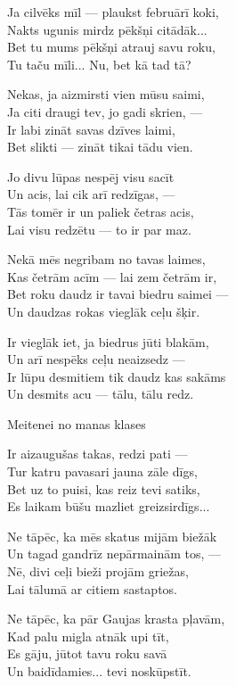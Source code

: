 \documentclass[14pt]{extarticle}
\begin{document}
{{Ja cilvēks mīl --- plaukst februārī koki,\\
Nakts ugunis mirdz pēkšņi citādāk...\\
Bet tu mums pēkšņi atrauj savu roku,\\
Tu taču mīli... Nu, bet kā tad tā?

Nekas, ja aizmirsti vien mūsu saimi,\\
Ja citi draugi tev, jo gadi skrien, ---\\
Ir labi zināt savas dzīves laimi,\\
Bet slikti --- zināt tikai tādu vien. 

Jo divu lūpas nespēj visu sacīt\\
Un acis, lai cik arī redzīgas, --- \\
Tās tomēr ir un paliek četras acis,\\
Lai visu redzētu --- to ir par maz. 

Nekā mēs negribam no tavas laimes,\\
Kas četrām acīm --- lai zem četrām ir,\\
Bet roku daudz ir tavai biedru saimei ---\\
Un daudzas rokas vieglāk ceļu šķir. 

Ir vieglāk iet, ja biedrus jūti blakām,\\
Un arī nespēks ceļu neaizsedz ---\\
Ir lūpu desmitiem tik daudz kas sakāms\\
Un desmits acu --- tālu, tālu redz.

\newpage

{\large \sc Meitenei no manas klases}

Ir aizaugušas takas, redzi pati ---\\
Tur katru pavasari jauna zāle dīgs,\\
Bet uz to puisi, kas reiz tevi satiks,\\
Es laikam būšu mazliet greizsirdīgs...

Ne tāpēc, ka mēs skatus mijām biežāk\\
Un tagad gandrīz nepārmainām tos, ---\\
Nē, divi ceļi bieži projām griežas,\\
Lai tālumā ar citiem sastaptos. 

Ne tāpēc, ka pār Gaujas krasta pļavām,\\
Kad palu migla atnāk upi tīt,\\
Es gāju, jūtot tavu roku savā\\
Un baidīdamies... tevi noskūpstīt. 


}}
\end{document}

